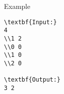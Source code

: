 Example
\begin{verbatim}
\textbf{Input:}
4
\\1 2
\\0 0 
\\1 0
\\2 0

\textbf{Output:}
3 2
\end{verbatim}